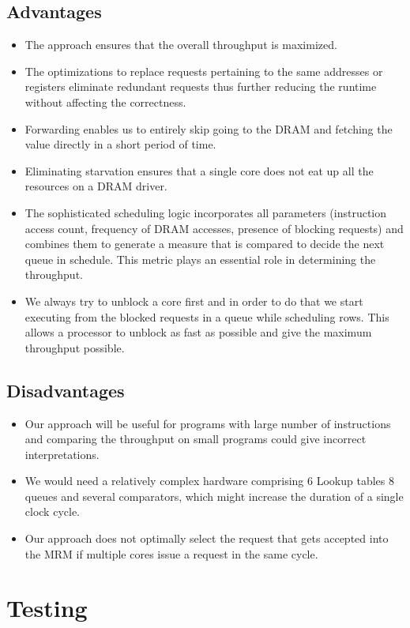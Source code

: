 \documentclass[hidelinks,12pt]{article}
\begin{document}
\subsection{Advantages}
\begin{itemize}
    \item The approach ensures that the overall throughput is maximized.
    \item The optimizations to replace requests pertaining to the same addresses or registers eliminate redundant requests thus further reducing the runtime without affecting the correctness.
    \item Forwarding enables us to entirely skip going to the DRAM and fetching the value directly in a short period of time.
    \item Eliminating starvation ensures that a single core does not eat up all the resources on a DRAM driver.
    \item The sophisticated scheduling logic incorporates all parameters (instruction access count, frequency of DRAM accesses, presence of blocking requests) and combines them to generate a measure that is compared to decide the next queue in schedule. This metric plays an essential role in determining the throughput.
    \item We always try to unblock a core first and in order to do that we start executing from the blocked requests in a queue while scheduling rows. This allows a processor to unblock as fast as possible and give the maximum throughput possible.
\end{itemize}
\subsection{Disadvantages}
\begin{itemize}
    \item Our approach will be useful for programs with large number of instructions and comparing the throughput on small programs could give incorrect interpretations.
    \item We would need a relatively complex hardware comprising 6 Lookup tables 8 queues and several comparators, which might increase the duration of a single clock cycle.
    \item Our approach does not optimally select the request that gets accepted into the MRM if multiple cores issue a request in the same cycle.
\end{itemize}
\section{Testing}
\end{document}
